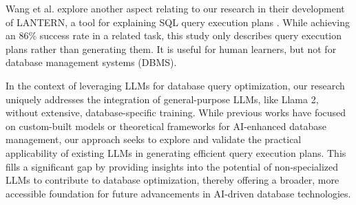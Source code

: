 Wang et al. explore another aspect relating to our research in their development of LANTERN, a tool for explaining SQL query execution plans \cite{wang2021}. While achieving an 86\% success rate in a related task, this study only describes query execution plans rather than generating them. It is useful for human learners, but not for database management systems (DBMS).

In the context of leveraging LLMs for database query optimization, our research uniquely addresses the integration of general-purpose LLMs, like Llama 2, without extensive, database-specific training. While previous works have focused on custom-built models or theoretical frameworks for AI-enhanced database management, our approach seeks to explore and validate the practical applicability of existing LLMs in generating efficient query execution plans. This fills a significant gap by providing insights into the potential of non-specialized LLMs to contribute to database optimization, thereby offering a broader, more accessible foundation for future advancements in AI-driven database technologies.

